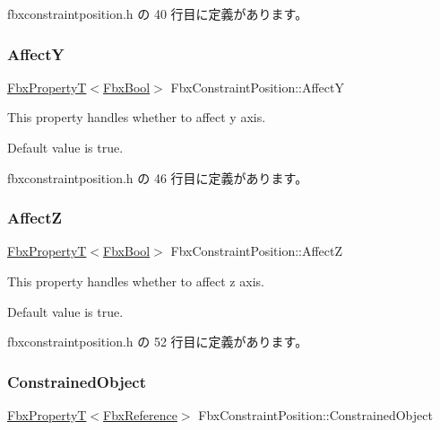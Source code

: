  fbxconstraintposition.\+h の 40 行目に定義があります。

\mbox{\label{class_fbx_constraint_position_afa5910286c656a2e87398645e3e3114d}} 
\subsubsection{\texorpdfstring{AffectY}{AffectY}}
{\footnotesize\ttfamily \hyperlink{class_fbx_property_t}{Fbx\+PropertyT}$<$\hyperlink{fbxtypes_8h_a92e0562b2fe33e76a242f498b362262e}{Fbx\+Bool}$>$ Fbx\+Constraint\+Position\+::\+AffectY}

This property handles whether to affect y axis.

Default value is true. 

 fbxconstraintposition.\+h の 46 行目に定義があります。

\mbox{\label{class_fbx_constraint_position_a4d99852028aff66edc99d669d2f1bbae}} 
\subsubsection{\texorpdfstring{AffectZ}{AffectZ}}
{\footnotesize\ttfamily \hyperlink{class_fbx_property_t}{Fbx\+PropertyT}$<$\hyperlink{fbxtypes_8h_a92e0562b2fe33e76a242f498b362262e}{Fbx\+Bool}$>$ Fbx\+Constraint\+Position\+::\+AffectZ}

This property handles whether to affect z axis.

Default value is true. 

 fbxconstraintposition.\+h の 52 行目に定義があります。

\mbox{\label{class_fbx_constraint_position_a5b6779be7ae7e754c31aac3552990df3}} 
\subsubsection{\texorpdfstring{Constrained\+Object}{ConstrainedObject}}
{\footnotesize\ttfamily \hyperlink{class_fbx_property_t}{Fbx\+PropertyT}$<$\hyperlink{fbxtypes_8h_a44df6a2eec915cf27cd481e5c5e48a24}{Fbx\+Reference}$>$ Fbx\+Constraint\+Position\+::\+Constrained\+Object}

